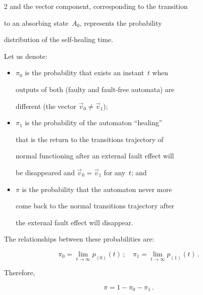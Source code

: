 \begin{multicols}{2}
and the vector component, corresponding to the transition

to an absorbing state~$A_0$, represents the probability

distribution of the self-healing time.



Let us denote:

\begin{itemize}

\item $\pi_0$ is the probability that exists an instant~$t$ when

outputs of both (faulty and fault-free automata) are

different (the vector $\vec v_0 \ne \vec v_1$);

\item

$\pi_1$ is the probability of the automaton ``healing''

that is the return to the transitions trajectory of

normal functioning after an external fault effect will

be disappeared and $\vec v_0=\vec v_1$ for any~$t$; and

\item

$\pi$ is the probability that the automaton never more

come back to the normal transitions trajectory after

the external fault effect will disappear.

\end{itemize}



The relationships between these probabilities are:

$$

\pi_0 =

\lim_{t\to\infty} p_{(0)}(t)\,;

\quad

\pi_1 =

\lim_{t\to\infty} p_{(1)}(t)\,.

$$

Therefore,

\begin{equation}

\pi=1-\pi_0-\pi_1\,.

\label{e3fr}

\end{equation}




\end{multicols}
